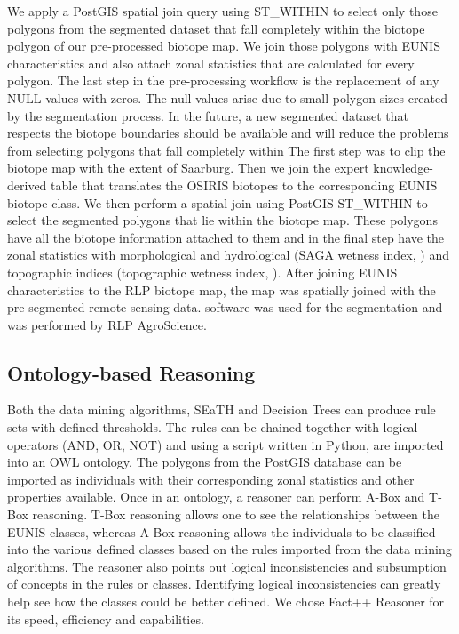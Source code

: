
We apply a PostGIS spatial join query using ST\_WITHIN to select only those
polygons from the segmented dataset that fall completely within the biotope
polygon of our pre-processed biotope map. We join those polygons
with EUNIS characteristics and also attach zonal statistics that are calculated
for every polygon. The last step in the pre-processing workflow is the
replacement of any NULL values with zeros. 
The null values arise due to small polygon sizes created by the segmentation
process. In the future, a new segmented dataset that respects the biotope
boundaries should be available and will reduce the problems from selecting
polygons that fall completely within
The first step was to clip the biotope map with the extent of Saarburg.
Then we join the expert knowledge-derived table that translates the OSIRIS
biotopes to the corresponding EUNIS biotope class. We then perform a spatial
join using PostGIS ST\_WITHIN to select the segmented polygons that lie within
the biotope map. These polygons have all the biotope information
attached to them and in the final step have the zonal statistics with
morphological and hydrological (SAGA wetness index, ) and topographic indices 
(topographic wetness index, ). 
After joining EUNIS characteristics to the RLP
biotope map, the map was spatially joined with the pre-segmented remote sensing
data. software was used for the segmentation and was performed by RLP AgroScience. 

\subsection{Ontology-based Reasoning}
Both the data mining algorithms, SEaTH and Decision Trees can produce rule
sets with defined thresholds. The rules can be chained together with logical
operators (AND, OR, NOT) and using a script written in Python, are imported
into an OWL ontology. The polygons from the PostGIS database can be imported
as individuals with their corresponding zonal statistics and other properties
available. Once in an ontology, a reasoner can perform A-Box and T-Box
reasoning. T-Box reasoning allows one to see the relationships between the
EUNIS classes, whereas A-Box reasoning allows the individuals to be classified
into the various defined classes based on the rules imported from the data
mining algorithms. The reasoner also points out logical inconsistencies and
subsumption of concepts in the rules or classes. Identifying logical
inconsistencies can greatly help see how the classes
could be better defined.
We chose Fact++ Reasoner for its speed, efficiency and
capabilities.

